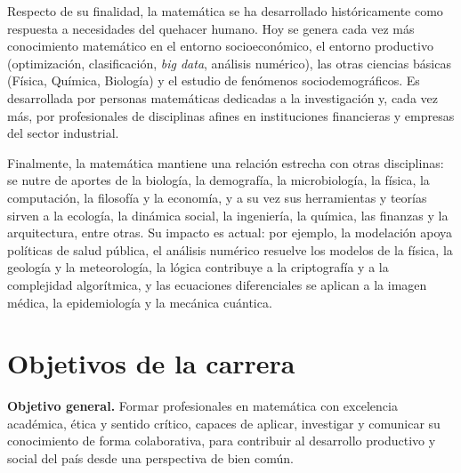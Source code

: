 \documentclass[11pt,a4paper]{article}
\begin{document}
Respecto de su finalidad, la matemática se ha desarrollado históricamente como respuesta a necesidades del quehacer humano. Hoy se genera cada vez más conocimiento matemático en el entorno socioeconómico, el entorno productivo (optimización, clasificación, \emph{big data}, análisis numérico), las otras ciencias básicas (Física, Química, Biología) y el estudio de fenómenos sociodemográficos. Es desarrollada por personas matemáticas dedicadas a la investigación y, cada vez más, por profesionales de disciplinas afines en instituciones financieras y empresas del sector industrial. 

Finalmente, la matemática mantiene una relación estrecha con otras disciplinas: se nutre de aportes de la biología, la demografía, la microbiología, la física, la computación, la filosofía y la economía, y a su vez sus herramientas y teorías sirven a la ecología, la dinámica social, la ingeniería, la química, las finanzas y la arquitectura, entre otras. Su impacto es actual: por ejemplo, la modelación apoya políticas de salud pública, el análisis numérico resuelve los modelos de la física, la geología y la meteorología, la lógica contribuye a la criptografía y a la complejidad algorítmica, y las ecuaciones diferenciales se aplican a la imagen médica, la epidemiología y la mecánica cuántica.

\section{Objetivos de la carrera}

\textbf{Objetivo general.} Formar profesionales en matemática con excelencia académica, ética y sentido crítico, capaces de aplicar, investigar y comunicar su conocimiento de forma colaborativa, para contribuir al desarrollo productivo y social del país desde una perspectiva de bien común.
\end{document}
